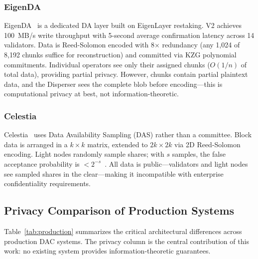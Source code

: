 \subsubsection{EigenDA}

EigenDA~\cite{eigenlayer2025eigenda, eigenlayer2025v2} is a dedicated DA layer
built on EigenLayer restaking. V2 achieves 100~MB/s write throughput with
5-second average confirmation latency across 14 validators. Data is
Reed-Solomon encoded with 8$\times$ redundancy (any 1,024 of 8,192 chunks
suffice for reconstruction) and committed via KZG polynomial commitments.
Individual operators see only their assigned chunks ($O(1/n)$ of total data),
providing partial privacy. However, chunks contain partial plaintext data, and
the Disperser sees the complete blob before encoding---this is computational
privacy at best, not information-theoretic.

\subsubsection{Celestia}

Celestia~\cite{celestia2024da, celestia2024gosquare} uses Data Availability
Sampling (DAS) rather than a committee. Block data is arranged in a $k \times
k$ matrix, extended to $2k \times 2k$ via 2D Reed-Solomon encoding. Light
nodes randomly sample shares; with $s$ samples, the false acceptance
probability is $<2^{-s}$~\cite{albassam2018fraud}. All data is public---validators
and light nodes see sampled shares in the clear---making it incompatible with
enterprise confidentiality requirements.

\subsection{Privacy Comparison of Production Systems}

Table~\ref{tab:production} summarizes the critical architectural differences
across production DAC systems. The privacy column is the central contribution
of this work: no existing system provides information-theoretic guarantees.

